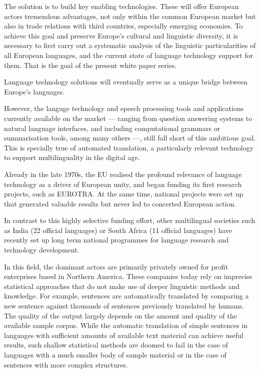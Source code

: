 \begin{multicols}{2}
   The solution is to build key enabling technologies. These will offer European actors tremendous advantages, not only within the common European market but also in trade relations with third countries, especially emerging economies.  To achieve this goal and preserve Europe’s cultural and linguistic diversity, it is necessary to first carry out a systematic analysis of the linguistic particularities of all European languages, and the current state of language technology support for them. That is the goal
of the present white paper series.

Language technology solutions will eventually serve as a unique bridge between Europe’s languages. 


However, the languge technology and speech processing tools and applications currently available on the market --- ranging from
question answering systems to natural language interfaces, and including computational grammars or summarisation tools, among many others ---, 
still fall short of this ambitious goal. This is specially true of automated translation, a particularly relevant technology to support multilinguality
in the digital age.

Already in the late 1970s, the EU realised the profound relevance of language technology as a driver of European unity, and began funding its first research projects, such as EUROTRA. At the same time, national projects were set up that generated valuable results but never led to concerted European action. 

In contrast to this highly selective funding effort, other multilingual societies such as India (22 official languages) or South Africa (11 official languages) have recently set up long term national programmes for language research and technology development.

In this field, the dominant actors are primarily privately owned for profit enterprises based in Northern America. These companies today rely on imprecise statistical approaches that do not make use of deeper linguistic methods and knowledge. For example, sentences are automatically translated by comparing a new sentence against thousands of sentences previously translated by humans. The quality of the output largely depends on the amount and quality of the available sample corpus. While the automatic translation of simple sentences in languages with sufficient amounts of available text material can achieve useful results, such shallow statistical methods are doomed to fail in the case of languages with a much smaller body of sample material or in the case of sentences with more complex structures.


\end{multicols}
